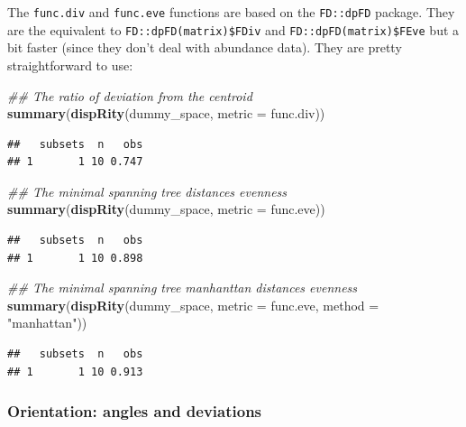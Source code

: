 \documentclass[
]{book}
\newenvironment{Shaded}{\begin{snugshade}}{\end{snugshade}}
\newcommand{\CommentTok}[1]{\textcolor[rgb]{0.56,0.35,0.01}{\textit{#1}}}
\newcommand{\DataTypeTok}[1]{\textcolor[rgb]{0.13,0.29,0.53}{#1}}
\newcommand{\KeywordTok}[1]{\textcolor[rgb]{0.13,0.29,0.53}{\textbf{#1}}}
\newcommand{\NormalTok}[1]{#1}
\newcommand{\StringTok}[1]{\textcolor[rgb]{0.31,0.60,0.02}{#1}}
\begin{document}
The \texttt{func.div} and \texttt{func.eve} functions are based on the \texttt{FD::dpFD} package.
They are the equivalent to \texttt{FD::dpFD(matrix)\$FDiv} and \texttt{FD::dpFD(matrix)\$FEve} but a bit faster (since they don't deal with abundance data).
They are pretty straightforward to use:

\begin{Shaded}
\begin{Highlighting}[]
\CommentTok{\#\# The ratio of deviation from the centroid }
\KeywordTok{summary}\NormalTok{(}\KeywordTok{dispRity}\NormalTok{(dummy\_space, }\DataTypeTok{metric =}\NormalTok{ func.div))}
\end{Highlighting}
\end{Shaded}

\begin{verbatim}
##   subsets  n   obs
## 1       1 10 0.747
\end{verbatim}

\begin{Shaded}
\begin{Highlighting}[]
\CommentTok{\#\# The minimal spanning tree distances evenness}
\KeywordTok{summary}\NormalTok{(}\KeywordTok{dispRity}\NormalTok{(dummy\_space, }\DataTypeTok{metric =}\NormalTok{ func.eve))}
\end{Highlighting}
\end{Shaded}

\begin{verbatim}
##   subsets  n   obs
## 1       1 10 0.898
\end{verbatim}

\begin{Shaded}
\begin{Highlighting}[]
\CommentTok{\#\# The minimal spanning tree manhanttan distances evenness}
\KeywordTok{summary}\NormalTok{(}\KeywordTok{dispRity}\NormalTok{(dummy\_space, }\DataTypeTok{metric =}\NormalTok{ func.eve,}
                 \DataTypeTok{method =} \StringTok{"manhattan"}\NormalTok{))}
\end{Highlighting}
\end{Shaded}

\begin{verbatim}
##   subsets  n   obs
## 1       1 10 0.913
\end{verbatim}

\hypertarget{orientation-angles-and-deviations}{%
\subsubsection{Orientation: angles and deviations}\label{orientation-angles-and-deviations}}
\end{document}
